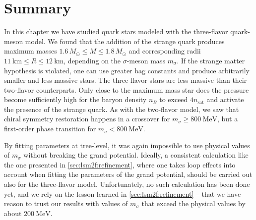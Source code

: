 \section{Summary}

In this chapter we have studied quark stars modeled with the three-flavor quark-meson model.
We found that the addition of the strange quark produces maximum masses $1.6 \, M_\odot \leq M \leq 1.8 \, M_\odot$
and corresponding radii $\SI{11}{\kilo\meter} \leq R \leq \SI{12}{\kilo\meter}$,
depending on the $\sigma$-meson mass $m_\sigma$.
If the strange matter hypothesis is violated, one can use greater bag constants and produce arbitrarily smaller and less massive stars.
The three-flavor stars are less massive than their two-flavor counterparts.
Only close to the maximum mass star does the pressure become sufficiently high
for the baryon density $n_B$ to exceed $4 n_\text{sat}$
and activate the presence of the strange quark.
As with the two-flavor model, we saw that chiral symmetry restoration happens in a crossover for $m_\sigma \geq \SI{800}{\mega\electronvolt}$,
but a first-order phase transition for $m_\sigma < \SI{800}{\mega\electronvolt}$.

By fitting parameters at tree-level, it was again impossible to use physical values of $m_\sigma$ without breaking the grand potential.
Ideally, a consistent calculation like the one presented in \cref{sec:lsm2f:refinement},
where one takes loop effects into account when fitting the parameters of the grand potential,
should be carried out also for the three-flavor model.
Unfortunately, no such calculation has been done yet,
and we rely on the lesson learned in \cref{sec:lsm2f:refinement} --
that we have reason to trust our results with values of $m_\sigma$ that exceed the physical values by about $\SI{200}{\mega\electronvolt}$.
